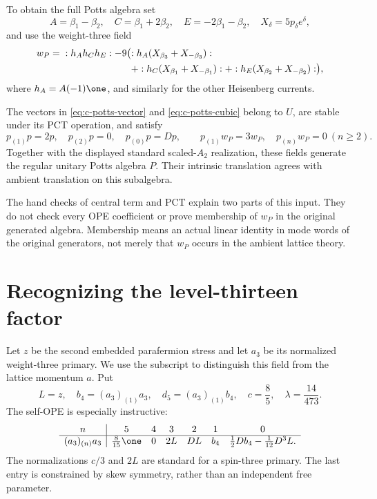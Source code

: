 To obtain the full Potts algebra set
\[
 A=\beta_1-\beta_2,\quad C=\beta_1+2\beta_2,
 \quad E=-2\beta_1-\beta_2,\quad X_\delta=5p_\delta e^\delta,
\]
and use the weight-three field
\begin{align}\label{eq:c-potts-cubic}
 w_P={}&:h_Ah_Ch_E:
 -9\bigl(:h_A(X_{\beta_3}+X_{-\beta_3}):\notag\\
 &\hspace{25mm}+:h_C(X_{\beta_1}+X_{-\beta_1}):
              +:h_E(X_{\beta_2}+X_{-\beta_2}):\bigr),
\end{align}
where $h_A=A(-1)\one$, and similarly for the other Heisenberg
currents.

\begin{constructioninput}
The vectors in \eqref{eq:c-potts-vector} and
\eqref{eq:c-potts-cubic} belong to $U$, are stable under its PCT
operation, and satisfy
\[
 p_{(1)}p=2p,\quad p_{(2)}p=0,\quad p_{(0)}p=Dp,
 \qquad p_{(1)}w_P=3w_P,\quad p_{(n)}w_P=0\ (n\geq2).
\]
Together with the displayed standard scaled-$A_2$ realization, these
fields generate the regular unitary Potts algebra $P$. Their intrinsic
translation agrees with ambient translation on this subalgebra.
\end{constructioninput}

The hand checks of central term and PCT explain two parts of this
input. They do not check every OPE coefficient or prove membership of
$w_P$ in the original generated algebra. Membership means an actual
linear identity in mode words of the original generators, not merely
that $w_P$ occurs in the ambient lattice theory.

\section{Recognizing the level-thirteen factor}

Let $z$ be the second embedded parafermion stress and let $a_3$ be its
normalized weight-three primary. We use the subscript to distinguish
this field from the lattice momentum $a$. Put
\[
 L=z,\quad b_4=(a_3)_{(1)}a_3,\quad
 d_5=(a_3)_{(1)}b_4,\quad c=\frac85,\quad\lambda=\frac{14}{473}.
\]
The self-OPE is especially instructive:
\begin{equation}\label{eq:c-pf-self}
\begin{array}{c|cccccc}
 n&5&4&3&2&1&0\\\hline
 (a_3)_{(n)}a_3&\frac8{15}\one&0&2L&DL&b_4&
                       \frac12Db_4-\frac1{12}D^3L.
\end{array}
\end{equation}
The normalizations $c/3$ and $2L$ are standard for a spin-three
primary. The last entry is constrained by skew symmetry, rather than
an independent free parameter.


